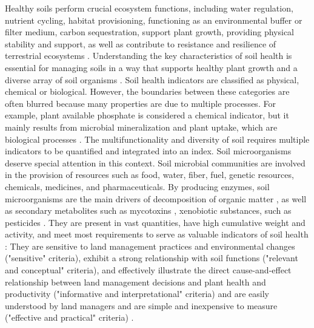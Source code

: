 Healthy soils perform crucial ecosystem functions, including water regulation, nutrient cycling, habitat provisioning, functioning as an environmental buffer or filter medium, carbon sequestration, support plant growth, providing physical stability and support, as well as contribute to resistance and resilience of terrestrial ecosystems \citep{maikhuri2012soil, lehmann2020concept, doran2000soil}. 
Understanding the key characteristics of soil health is essential for managing soils in a way that supports healthy plant growth and a diverse array of soil organisms \citep{lehmann2020concept}. Soil health indicators are classified as physical, chemical or biological. However, the boundaries between these categories are often blurred because many properties are due to multiple processes. For example, plant available phosphate is considered a chemical indicator, but it mainly results from microbial mineralization and plant uptake, which are biological processes \citep{lehmann2020concept}. The multifunctionality and diversity of soil requires multiple indicators to be quantified and integrated into an index. Soil microorganisms deserve special attention in this context. Soil microbial communities are involved in the provision of resources such as food, water, fiber, fuel, genetic resources, chemicals, medicines, and pharmaceuticals. By producing enzymes, soil microorganisms are the main drivers of decomposition of organic matter \citep{hattenschwiler2005biodiversity, prasad2021soil}, as well as secondary metabolites such as mycotoxins \citep{juraschek2022mycotoxins}, xenobiotic substances, such as pesticides \citep{parte2017microbial}. They are present in vast quantities, have high cumulative weight and activity, and meet most requirements to serve as valuable indicators of soil health \citep{sacca2017ecosystem}: They are sensitive to land management practices and environmental changes ("sensitive" criteria), exhibit a strong relationship with soil functions ("relevant and conceptual" criteria), and effectively illustrate the direct cause-and-effect relationship between land management decisions and plant health and productivity ("informative and interpretational" criteria) and are easily understood by land managers and are simple and inexpensive to measure ("effective and practical" criteria) \citep{sacca2017ecosystem, doran2000soil}.





